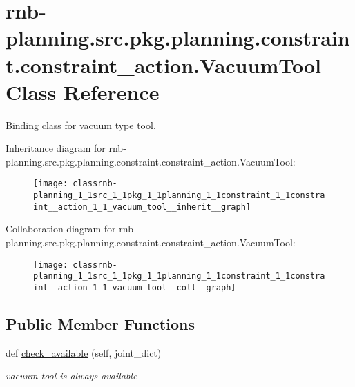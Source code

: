 \hypertarget{classrnb-planning_1_1src_1_1pkg_1_1planning_1_1constraint_1_1constraint__action_1_1_vacuum_tool}{}\section{rnb-\/planning.src.\+pkg.\+planning.\+constraint.\+constraint\+\_\+action.\+Vacuum\+Tool Class Reference}
\label{classrnb-planning_1_1src_1_1pkg_1_1planning_1_1constraint_1_1constraint__action_1_1_vacuum_tool}


\hyperlink{classrnb-planning_1_1src_1_1pkg_1_1planning_1_1constraint_1_1constraint__action_1_1_binding}{Binding} class for vacuum type tool.  




Inheritance diagram for rnb-\/planning.src.\+pkg.\+planning.\+constraint.\+constraint\+\_\+action.\+Vacuum\+Tool\+:
\nopagebreak
\begin{figure}[H]
\begin{center}
\leavevmode
\texttt{[image: classrnb-planning\_1\_1src\_1\_1pkg\_1\_1planning\_1\_1constraint\_1\_1constraint\_\_action\_1\_1\_vacuum\_tool\_\_inherit\_\_graph]}
\end{center}
\end{figure}


Collaboration diagram for rnb-\/planning.src.\+pkg.\+planning.\+constraint.\+constraint\+\_\+action.\+Vacuum\+Tool\+:
\nopagebreak
\begin{figure}[H]
\begin{center}
\leavevmode
\texttt{[image: classrnb-planning\_1\_1src\_1\_1pkg\_1\_1planning\_1\_1constraint\_1\_1constraint\_\_action\_1\_1\_vacuum\_tool\_\_coll\_\_graph]}
\end{center}
\end{figure}
\subsection*{Public Member Functions}
\begin{DoxyCompactItemize}
\item 
\mbox{\label{classrnb-planning_1_1src_1_1pkg_1_1planning_1_1constraint_1_1constraint__action_1_1_vacuum_tool_af45b379bdb3a9cbd67e59c7272a368fd}} 
def \hyperlink{classrnb-planning_1_1src_1_1pkg_1_1planning_1_1constraint_1_1constraint__action_1_1_vacuum_tool_af45b379bdb3a9cbd67e59c7272a368fd}{check\+\_\+available} (self, joint\+\_\+dict)
\begin{DoxyCompactList}\small\item\em vacuum tool is always available \end{DoxyCompactList}\end{DoxyCompactItemize}
